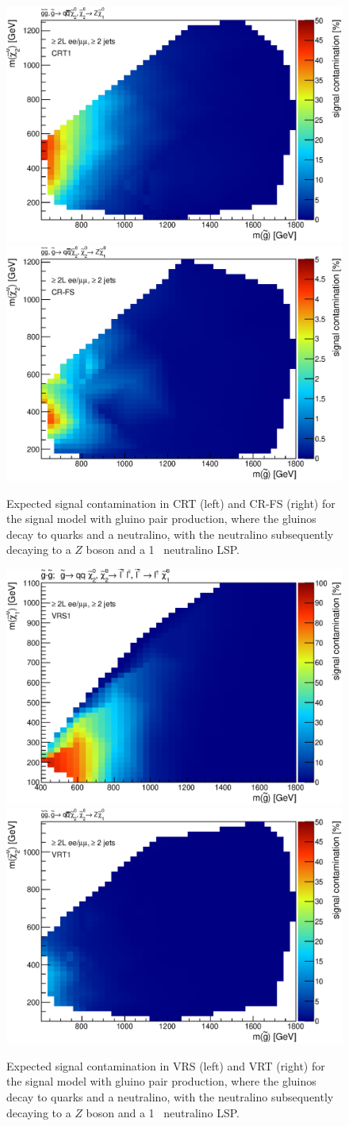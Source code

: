 \begin{figure}[ht]
\centering
\includegraphics[width=.48\textwidth]{figures/signalacceptcontam/cont_SM_GG_N2_1_CRT1.eps}
\includegraphics[width=.48\textwidth]{figures/signalacceptcontam/cont_SM_GG_N2_1_CR-FS.eps}
\caption{
Expected signal contamination in CRT (left) and CR-FS (right) for the signal model with gluino pair production, where the gluinos decay to quarks and a neutralino, 
with the neutralino subsequently decaying to a $Z$ boson and a 1 \gev~neutralino LSP.}
\label{fig:sig_contam_CRT}
\end{figure}

\begin{figure}[ht]
\centering
\includegraphics[width=.48\textwidth]{figures/signalacceptcontam/cont_SM_GG_N2_1_VRS1.eps}
\includegraphics[width=.48\textwidth]{figures/signalacceptcontam/cont_SM_GG_N2_1_VRT1.eps}
\caption{
Expected signal contamination in VRS (left) and VRT (right) for the signal model with gluino pair production, where the gluinos decay to quarks and a neutralino, 
with the neutralino subsequently decaying to a $Z$ boson and a 1 \gev~neutralino LSP.}
\label{fig:sig_contam_VR}
\end{figure}

